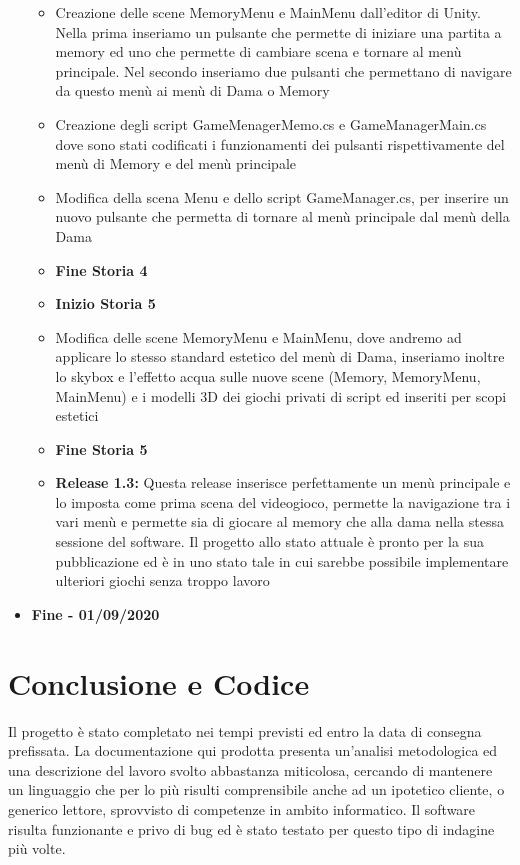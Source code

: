 \documentclass[12pt]{article}
\begin{document}
\begin{itemize}
\begin{itemize}
	\item Creazione delle scene MemoryMenu e MainMenu dall'editor di Unity. Nella prima inseriamo un pulsante che permette di iniziare una partita a memory ed uno che permette di cambiare scena e tornare al menù principale. Nel secondo inseriamo due pulsanti che permettano di navigare da questo menù ai menù di Dama o Memory
	\item Creazione degli script GameMenagerMemo.cs e GameManagerMain.cs dove sono stati codificati i funzionamenti dei pulsanti rispettivamente del menù di Memory e del menù principale
	\item Modifica della scena Menu e dello script GameManager.cs, per inserire un nuovo pulsante che permetta di tornare al menù principale dal menù della Dama
	\item \textbf{Fine Storia 4}
	\item \textbf{Inizio Storia 5}
	\item Modifica delle scene MemoryMenu e MainMenu, dove andremo ad applicare lo stesso standard estetico del menù di Dama, inseriamo inoltre lo skybox e l'effetto acqua sulle nuove scene (Memory, MemoryMenu, MainMenu) e i modelli 3D dei giochi privati di script ed inseriti per scopi estetici
	\item \textbf{Fine Storia 5}
	\item \textbf{Release 1.3:} Questa release inserisce perfettamente un menù principale e lo imposta come prima scena del videogioco, permette la navigazione tra i vari menù e permette sia di giocare al memory che alla dama nella stessa sessione del software. Il progetto allo stato attuale è pronto per la sua pubblicazione ed è in uno stato tale in cui sarebbe possibile implementare ulteriori giochi senza troppo lavoro
	\end{itemize}
\item \textbf{Fine - 01/09/2020}
\end{itemize}

\section{Conclusione e Codice}
Il progetto è stato completato nei tempi previsti ed entro la data di consegna prefissata. La documentazione qui prodotta presenta un'analisi metodologica ed una descrizione del lavoro svolto abbastanza miticolosa, cercando di mantenere un linguaggio che per lo più risulti comprensibile anche ad un ipotetico cliente, o generico lettore, sprovvisto di competenze in ambito informatico. Il software risulta funzionante e privo di bug ed è stato testato per questo tipo di indagine più volte.
\end{document}
